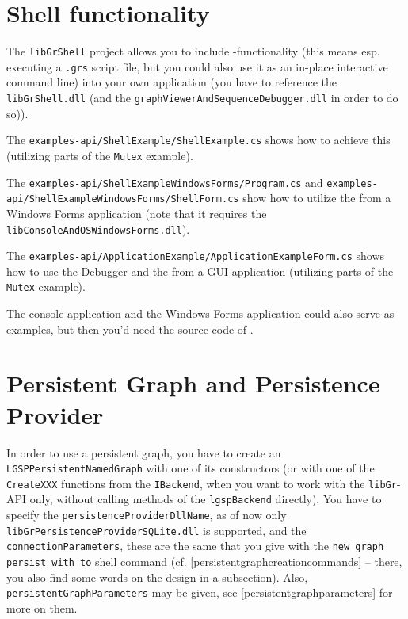 \section{Shell functionality}

The \texttt{libGrShell} project allows you to include \GrShell{}-functionality (this means esp. executing a \texttt{.grs} script file, but you could also use it as an in-place interactive command line) into your own application (you have to reference the \texttt{lib\-Gr\-Shell.dll} (and the \texttt{graph\-Viewer\-And\-Sequence\-Debugger.dll} in order to do so)).

The \texttt{examples-api/ShellExample/ShellExample.cs} shows how to achieve this (utilizing parts of the \texttt{Mutex} example).

The \texttt{examples-api/Shell\-Example\-Windows\-Forms/Program.cs} and \texttt{examples-api/Shell\-Example\-Windows\-Forms/ShellForm.cs} show how to utilize the \LibGrShell{} from a Windows Forms application (note that it requires the \texttt{lib\-Console\-And\-OS\-Windows\-Forms.dll}).

The \texttt{examples-api/ApplicationExample/ApplicationExampleForm.cs} shows how to use the Debugger and the \GrShell{} from a GUI application (utilizing parts of the \texttt{Mutex} example).

The console application \GrShell{} and the Windows Forms application \GGrShell{} could also serve as examples, but then you'd need the source code of \GrG.


\section{Persistent Graph and Persistence Provider}
In order to use a persistent graph, you have to create an \texttt{LGSPPersistentNamedGraph} with one of its constructors (or with one of the \texttt{CreateXXX} functions from the \texttt{IBackend}, when you want to work with the \texttt{libGr}-API only, without calling methods of the \texttt{lgspBackend} directly).
You have to specify the \texttt{persistenceProviderDllName}, as of now only \texttt{libGr\-Persistence\-Provider\-SQLite.dll} is supported, and the \texttt{connection\-Parameters}, these are the same that you give with the \texttt{new graph persist with to} shell command (cf. \ref{persistentgraphcreationcommands} -- there, you also find some words on the design in a subsection).
Also, \texttt{persistent\-Graph\-Parameters} may be given, see \ref{persistentgraphparameters} for more on them.


